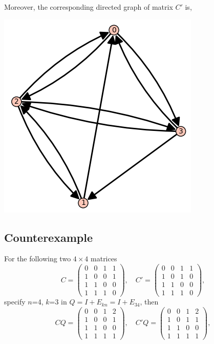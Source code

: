 \documentclass[12pt, a4paper]{article}
\theoremstyle{plain}
\theoremstyle{definition}
\begin{document}
    Moreover, the corresponding directed graph of matrix $C'$ is, \cite[sage]{sage}
    \begin{center}
    \includegraphics{graph_Cprime.PNG}
    \end{center}



\subsection{Counterexample}
    For the following two $4\times 4$ matrices
    $$C=\begin{pmatrix}
    0 & 0 & 1 & 1\\
    1 & 0 & 0 & 1\\
    1 & 1 & 0 & 0\\
    1 & 1 & 1 & 0
    \end{pmatrix},\quad C'=\begin{pmatrix}
    0 & 0 & 1 & 1\\
    1 & 0 & 1 &  0\\
    1 & 1 & 0 & 0\\
    1 & 1 & 1 & 0
    \end{pmatrix},$$
    specify $n$=4, $k$=3 in $Q = I +E_{kn} = I + E_{34}$, then
    $$CQ=\begin{pmatrix}
    0 & 0 & 1 & 2\\
    1 & 0 & 0 & 1\\
    1 & 1 & 0 & 0\\
    1 & 1 & 1 & 1
    \end{pmatrix},\quad C'Q=\begin{pmatrix}
    0 & 0 & 1 & 2\\
    1 & 0 & 1 & 1\\
    1 & 1 & 0 & 0\\
    1 & 1 & 1 & 1
    \end{pmatrix},$$
\end{document}
